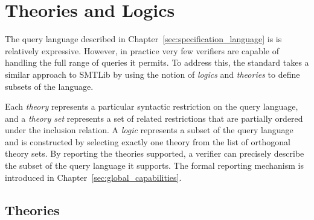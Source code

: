    

\chapter{Theories and Logics}
\label{sec:theories-logics}

The query language described in Chapter~\ref{sec:specification_language} is is relatively expressive. However, in practice very few verifiers are capable of handling the full range of queries it permits.  To address this, the \vnnlib{} standard takes a similar approach to SMTLib by using the notion of \emph{logics} and \emph{theories} to define subsets of the language.

Each \emph{theory} represents a particular syntactic restriction on the query language, and a \emph{theory set} represents a set of related restrictions that are partially ordered under the inclusion relation. A \emph{logic} represents a subset of the query language and is constructed by selecting exactly one theory from the list of orthogonal theory sets. 
By reporting the theories supported, a verifier can precisely describe the subset of the query language it supports. The formal reporting mechanism is introduced in Chapter~\ref{sec:global_capabilities}.

\section{Theories}

